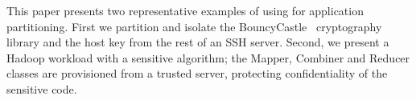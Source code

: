
This paper presents two representative examples of using \sysname{} for application partitioning.
First we partition and isolate the BouncyCastle~\cite{bouncycastle}
cryptography library and the host key from the rest of an SSH server.
Second, we present a Hadoop workload with a sensitive algorithm;
the %
Mapper, Combiner and Reducer classes are provisioned from a trusted server, protecting confidentiality of the sensitive code.
%

